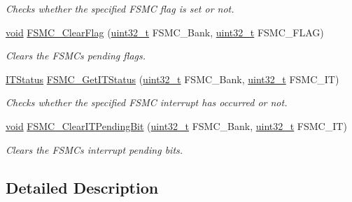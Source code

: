 \begin{DoxyCompactItemize}
\begin{DoxyCompactList}\small\item\em Checks whether the specified F\+S\+MC flag is set or not. \end{DoxyCompactList}\item 
\hyperlink{usb__devapi_8h_afabf60e7f57651d6d595a02c75f07cd0}{void} \hyperlink{group___f_s_m_c___private___functions_ga697618f2de0ad9a8a82461ddbebd5264}{F\+S\+M\+C\+\_\+\+Clear\+Flag} (\hyperlink{_p_e___types_8h_a33594304e786b158f3fb30289278f5af}{uint32\+\_\+t} F\+S\+M\+C\+\_\+\+Bank, \hyperlink{_p_e___types_8h_a33594304e786b158f3fb30289278f5af}{uint32\+\_\+t} F\+S\+M\+C\+\_\+\+F\+L\+AG)
\begin{DoxyCompactList}\small\item\em Clears the F\+S\+MC\textquotesingle{}s pending flags. \end{DoxyCompactList}\item 
\hyperlink{agilefox_2library_2inc_2stm32f10x__type_8h_aacbd7ed539db0aacd973a0f6eca34074}{I\+T\+Status} \hyperlink{group___f_s_m_c___private___functions_ga7fce9ca889d33cd8b8b7413875dd4d73}{F\+S\+M\+C\+\_\+\+Get\+I\+T\+Status} (\hyperlink{_p_e___types_8h_a33594304e786b158f3fb30289278f5af}{uint32\+\_\+t} F\+S\+M\+C\+\_\+\+Bank, \hyperlink{_p_e___types_8h_a33594304e786b158f3fb30289278f5af}{uint32\+\_\+t} F\+S\+M\+C\+\_\+\+IT)
\begin{DoxyCompactList}\small\item\em Checks whether the specified F\+S\+MC interrupt has occurred or not. \end{DoxyCompactList}\item 
\hyperlink{usb__devapi_8h_afabf60e7f57651d6d595a02c75f07cd0}{void} \hyperlink{group___f_s_m_c___private___functions_gad9387e7674b8a376256a3378649e004e}{F\+S\+M\+C\+\_\+\+Clear\+I\+T\+Pending\+Bit} (\hyperlink{_p_e___types_8h_a33594304e786b158f3fb30289278f5af}{uint32\+\_\+t} F\+S\+M\+C\+\_\+\+Bank, \hyperlink{_p_e___types_8h_a33594304e786b158f3fb30289278f5af}{uint32\+\_\+t} F\+S\+M\+C\+\_\+\+IT)
\begin{DoxyCompactList}\small\item\em Clears the F\+S\+MC\textquotesingle{}s interrupt pending bits. \end{DoxyCompactList}\end{DoxyCompactItemize}


\subsection{Detailed Description}


